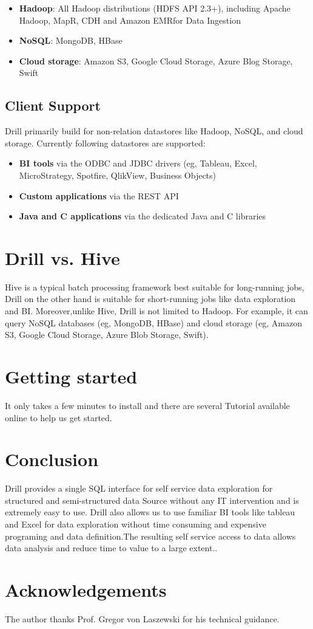 \documentclass[9pt,twocolumn,twoside]{styles/osajnl}
\begin{document}
\begin{itemize}
	\item \textbf{Hadoop}: All Hadoop distributions (HDFS API 2.3+), including Apache Hadoop, MapR, CDH and Amazon EMRfor Data Ingestion
	\item \textbf{NoSQL}: MongoDB, HBase
	\item \textbf{Cloud storage}: Amazon S3, Google Cloud Storage, Azure Blog Storage, Swift

\end{itemize}

\subsection{Client Support}
Drill primarily build for non-relation datastores like Hadoop, NoSQL, and cloud storage.
Currently following datastores are supported:


\begin{itemize}
	\item \textbf{BI tools} via the ODBC and JDBC drivers (eg, Tableau, Excel, MicroStrategy, Spotfire, QlikView, Business Objects)
	\item \textbf{Custom applications} via the REST API
	\item \textbf{Java and C applications} via the dedicated Java and C libraries
	
\end{itemize}

\section{Drill vs. Hive}
Hive is a typical batch processing framework best suitable for long-running jobs, Drill 
on the other hand is suitable for short-running jobs like data exploration and BI.
Moreover,unlike Hive, Drill is not limited to Hadoop. For example, it can query NoSQL databases (eg, MongoDB, HBase) and cloud storage (eg, Amazon S3, Google Cloud Storage, Azure Blob Storage, Swift).

\section{Getting started}
It only takes a few minutes to install and there are several Tutorial \cite{Tutorial} available online to help us get started.

\section{Conclusion}
Drill provides a single SQL interface for self service data exploration for structured and semi-structured data Source without any IT intervention and is extremely easy to use. Drill also allows us to use familiar BI tools like tableau and Excel for data exploration without time consuming and expensive programing and data definition.The resulting self service access to data allows data analysis and reduce time to value to a large extent..

\section*{Acknowledgements}

The author thanks Prof. Gregor von Laszewski for his technical guidance.




\end{document}
